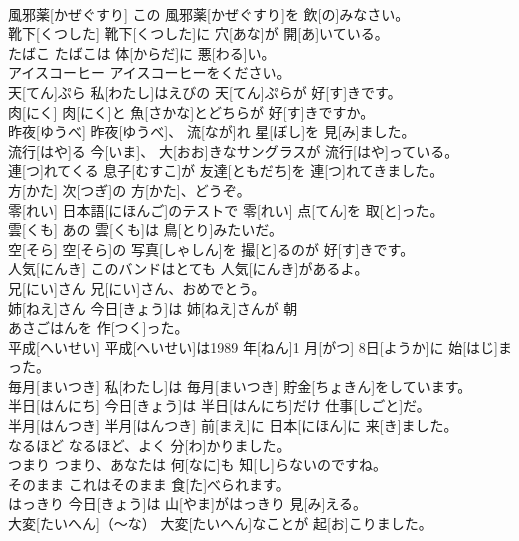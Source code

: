 \documentclass[8pt]{extreport}
\begin{document}
\begin{CJK}{UTF8}{min}
\\	風邪薬[かぜぐすり]	この 風邪薬[かぜぐすり]を 飲[の]みなさい。		
\\	靴下[くつした]	靴下[くつした]に 穴[あな]が 開[あ]いている。		
\\	たばこ	たばこは 体[からだ]に 悪[わる]い。		
\\	アイスコーヒー	アイスコーヒーをください。		
\\	天[てん]ぷら	私[わたし]はえびの 天[てん]ぷらが 好[す]きです。		
\\	肉[にく]	肉[にく]と 魚[さかな]とどちらが 好[す]きですか。		
\\	昨夜[ゆうべ]	昨夜[ゆうべ]、 流[なが]れ 星[ぼし]を 見[み]ました。		
\\	流行[はや]る	今[いま]、 大[おお]きなサングラスが 流行[はや]っている。		
\\	連[つ]れてくる	息子[むすこ]が 友達[ともだち]を 連[つ]れてきました。		
\\	方[かた]	次[つぎ]の 方[かた]、どうぞ。		
\\	零[れい]	日本語[にほんご]のテストで 零[れい] 点[てん]を 取[と]った。		
\\	雲[くも]	あの 雲[くも]は 鳥[とり]みたいだ。		
\\	空[そら]	空[そら]の 写真[しゃしん]を 撮[と]るのが 好[す]きです。		
\\	人気[にんき]	このバンドはとても 人気[にんき]があるよ。		
\\	兄[にい]さん	兄[にい]さん、おめでとう。		
\\	姉[ねえ]さん	今日[きょう]は 姉[ねえ]さんが 朝
\\	あさごはんを 作[つく]った。		
\\	平成[へいせい]	平成[へいせい]は1989 年[ねん]1 月[がつ] 8日[ようか]に 始[はじ]まった。		
\\	毎月[まいつき]	私[わたし]は 毎月[まいつき] 貯金[ちょきん]をしています。		
\\	半日[はんにち]	今日[きょう]は 半日[はんにち]だけ 仕事[しごと]だ。
\\	半月[はんつき]	半月[はんつき] 前[まえ]に 日本[にほん]に 来[き]ました。		
\\	なるほど	なるほど、よく 分[わ]かりました。		
\\	つまり	つまり、あなたは 何[なに]も 知[し]らないのですね。		
\\	そのまま	これはそのまま 食[た]べられます。		
\\	はっきり	今日[きょう]は 山[やま]がはっきり 見[み]える。		
\\	大変[たいへん]（～な）	大変[たいへん]なことが 起[お]こりました。		

\end{CJK}
\end{document}
